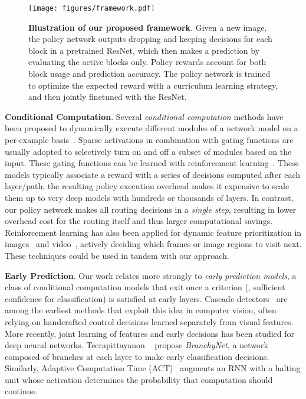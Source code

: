 \documentclass[10pt,twocolumn,letterpaper]{article}
\begin{document}
\begin{figure*}[t!]
\begin{center}
   \texttt{[image: figures/framework.pdf]}
\end{center}
\vspace{-0.3in}
   \caption{\textbf{Illustration of our proposed framework}. Given a new image, the policy network outputs dropping and keeping decisions for each block in a pretrained ResNet, which then makes a prediction by evaluating the active blocks only. Policy rewards account for both block usage and prediction accuracy. The policy network is trained to optimize the expected reward with a curriculum learning strategy, and then jointly finetuned with the ResNet.}
\label{fig:framework}
\end{figure*}\vspace{0.05in}\noindent\textbf{Conditional Computation}. Several {\em conditional computation} methods have been proposed to dynamically execute different modules of a network model on a per-example basis~\cite{bengio2013deep,bengio2016conditional}. Sparse activations in combination with gating functions are usually adopted to selectively turn on and off a subset of modules based on the input. These gating functions can be learned with reinforcement learning~\cite{bengio2016conditional,liu2017dynamic, denoyer2014deep}. These models typically associate a reward with a series of decisions computed after each layer/path; the resulting policy execution overhead makes it expensive to scale them up to very deep models with hundreds or thousands of layers. In contrast, our policy network makes all routing decisions in a {\em single step}, resulting in lower overhead cost for the routing itself and thus larger computational savings. %
Reinforcement learning has also been applied for dynamic feature prioritization in images~\cite{karayev2014anytime} and video~\cite{su2016leaving,yeung2016end}, actively deciding which frames or image regions to visit next. %
These techniques could be used in tandem with our approach.  

\vspace{0.05in}\noindent\textbf{Early Prediction}. Our work relates more strongly to \emph{early prediction models}, a class of conditional computation models that exit once a criterion (\eg, sufficient confidence for classification) is satisfied at early layers. Cascade detectors~\cite{felzenszwalb2010cascade,viola2004robust} are among the earliest methods that exploit this idea in computer vision, often relying on handcrafted control decisions learned separately from visual features. More recently, joint learning of features and early decisions has been studied for deep neural networks. Teerapittayanon \etal ~\cite{teerapittayanon2016branchynet} propose {\em BranchyNet}, a network composed of branches at each layer to make early classification decisions. Similarly, Adaptive Computation Time (ACT)~\cite{graves2016adaptive} augments an RNN  with a halting unit whose activation determines the probability that computation should continue.
\end{document}
